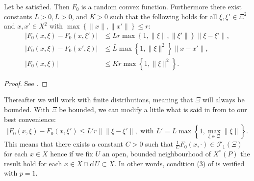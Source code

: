 \documentclass{amsart}
\begin{document}
\begin{proposition}\label{prop 2}
    Let  be satisfied. Then $F_0$ is a random convex function. Furthermore there exist constants $L>0, \bar{L}>0$, and $K>0$ such that the following holds for all $\xi,\xi'\in\Xi^2$ and $x,x'\in X^2$ with $\max\left\{\lVert x\rVert, \lVert x' \rVert\right\}\leq r$:
    \begin{align}
        \lvert F_0\left(x,\xi\right)- F_0\left(x,\xi'\right)\rvert &\leq Lr\max\left\{1,\lVert \xi\rVert, \lVert \xi'\rVert\right\}\lVert \xi-\xi'\rVert, \label{lips}\\
        \lvert F_0\left(x,\xi\right)- F_0\left(x',\xi\right)\rvert &\leq \bar{L}\max\left\{1,\lVert\xi\rVert^2\right\}\lVert x-x'\rVert, \\
        \lvert F_0\left(x,\xi\right) \rvert&\leq Kr\max\left\{1,\lVert\xi\rVert^2\right\}.
    \end{align}
     
\end{proposition}
\begin{proof}
    See \cite[Proposition 22]{romisch_stability_2003}.
\end{proof}
Thereafter we will work with finite distributions, meaning that $\Xi$ will always be bounded. With $\Xi$ be bounded, we can modify a little what is said in  from  to our best convenience:
$$
\lvert F_0\left(x,\xi\right)- F_0\left(x,\xi'\right) \leq L'r \lVert \lVert \xi-\xi'\rVert, \text{ with } L'=L\max\left\{1,\max_{\xi\in\Xi}\lVert\xi\rVert\right\}.
$$
This means that there exists a constant $C>0$ such that $\frac{1}{C}F_0\left(x,\cdot\right)\in\mathcal{F}_1\left(\Xi\right)$ for each $x\in X$ hence if we fix $U$ an open, bounded neighbourhood of $X^*\left(P\right)$ the result hold for each $x\in X\cap \text{cl}U\subset X$. In other words, condition (3) of  is verified with $p=1$.
\end{document}

